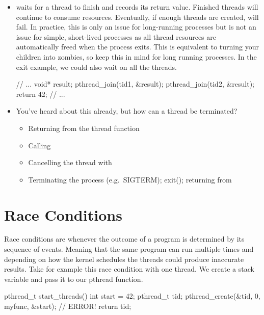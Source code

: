 \begin{itemize}
\begin{code}[language=C]
{  // No code is run after exit
}
\end{code}

\item {} waits for a thread to finish and records its return value. Finished threads will continue to consume resources. Eventually, if enough threads are created,  will fail. In practice, this is only an issue for long-running processes but is not an issue for simple, short-lived processes as all thread resources are automatically freed when the process exits. This is equivalent to turning your children into zombies, so keep this in mind for long running processes. In the exit example, we could also wait on all the threads.

\begin{code}[language=C]
// ...
  void* result;
  pthread_join(tid1, &result);
  pthread_join(tid2, &result); 
  return 42;
// ...
\end{code}

\item You've heard about this already, but how can a thread be terminated? 
\begin{itemize}
  \tightlist
\item Returning from the thread function 
\item Calling  
\item Cancelling the thread with  
\item Terminating the process (e.g.~SIGTERM); exit(); returning from 
\end{itemize}

\end{itemize}

\section{Race Conditions}

Race conditions are whenever the outcome of a program is determined by its sequence of events. Meaning that the same program can run multiple times and depending on how the kernel schedules the threads could produce inaccurate results. Take for example this race condition with one thread. We create a stack variable and pass it to our pthread function.

\begin{code}
pthread_t start_threads() {
  int start = 42;
  pthread_t tid;
  pthread_create(&tid, 0, myfunc, &start); // ERROR!
  return tid;
}
\end{code}

